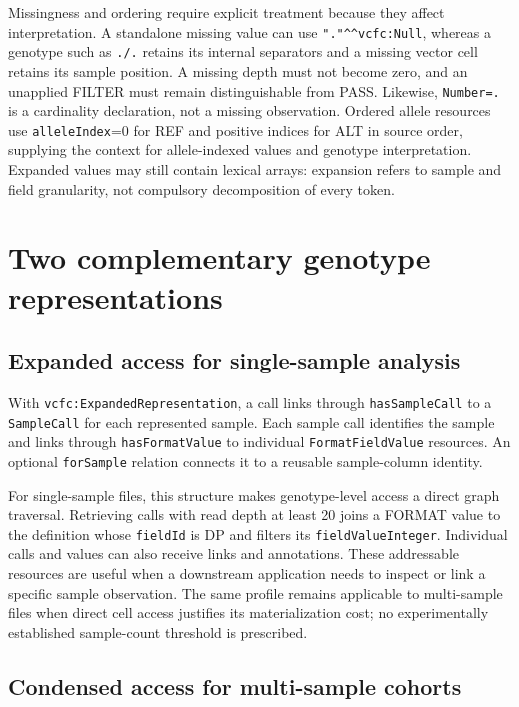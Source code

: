 \documentclass{ceurart}
\newcommand{\term}[1]{\texttt{#1}}
\begin{document}
Missingness and ordering require explicit treatment because they affect interpretation. A standalone missing value can use \term{"."\textasciicircum{}\textasciicircum{}vcfc:Null}, whereas a genotype such as \term{./.} retains its internal separators and a missing vector cell retains its sample position. A missing depth must not become zero, and an unapplied FILTER must remain distinguishable from PASS. Likewise, \term{Number=.} is a cardinality declaration, not a missing observation. Ordered allele resources use \term{alleleIndex}=0 for REF and positive indices for ALT in source order, supplying the context for allele-indexed values and genotype interpretation. Expanded values may still contain lexical arrays: expansion refers to sample and field granularity, not compulsory decomposition of every token.

\section{Two complementary genotype representations}
\label{sec:profiles}

\subsection{Expanded access for single-sample analysis}

With \term{vcfc:ExpandedRepresentation}, a call links through \term{hasSampleCall} to a \term{SampleCall} for each represented sample. Each sample call identifies the sample and links through \term{hasFormatValue} to individual \term{FormatFieldValue} resources. An optional \term{forSample} relation connects it to a reusable sample-column identity.

For single-sample files, this structure makes genotype-level access a direct graph traversal. Retrieving calls with read depth at least 20 joins a FORMAT value to the definition whose \term{fieldId} is DP and filters its \term{fieldValueInteger}. Individual calls and values can also receive links and annotations. These addressable resources are useful when a downstream application needs to inspect or link a specific sample observation. The same profile remains applicable to multi-sample files when direct cell access justifies its materialization cost; no experimentally established sample-count threshold is prescribed.

\subsection{Condensed access for multi-sample cohorts}
\end{document}
